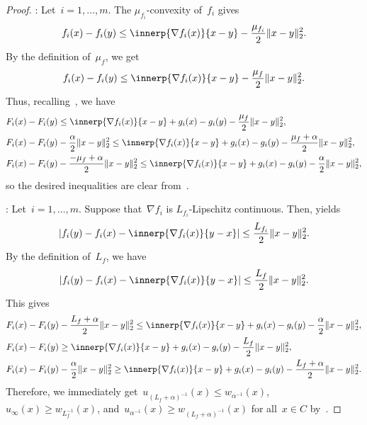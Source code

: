 \documentclass[../main]{subfiles}
\begin{document}
\begin{proof}
    :
    Let~$i = 1, \dots, m$.
    The $\mu_{f_i}$-convexity of~$f_i$ gives
    \begin{equation}
        f_i(x) - f_i(y) \le \innerp{\nabla f_i(x)}{x - y} - \frac{\mu_{f_i}}{2} \norm{x - y}_2^2
        .\end{equation}
    By the definition of~$\mu_f$, we get
    \begin{equation}
        f_i(x) - f_i(y) \le \innerp{\nabla f_i(x)}{x - y} - \frac{\mu_f}{2} \norm{x - y}_2^2
        .\end{equation}
    Thus, recalling~, we have
    \begin{align}
         & F_i(x) - F_i(y) \le \innerp{\nabla f_i(x)}{x - y} + g_i(x) - g_i(y) - \frac{\mu_f}{2} \norm{x - y}_2^2,                                              \\
         & F_i(x) - F_i(y) - \frac{\alpha}{2}\norm{x - y}_2^2 \le \innerp{\nabla f_i(x)}{x - y} + g_i(x) - g_i(y) - \frac{\mu_f + \alpha}{2} \norm{x - y}_2^2,  \\
         & F_i(x) - F_i(y) - \frac{- \mu_f + \alpha}{2}\norm{x - y}_2^2 \le \innerp{\nabla f_i(x)}{x - y} + g_i(x) - g_i(y) - \frac{\alpha}{2} \norm{x - y}_2^2
        ,\end{align}
    so the desired inequalities are clear from~.

    :
    Let~$i = 1, \dots, m$.
    Suppose that~$\nabla f_i$ is $L_{f_i}$-Lipschitz continuous.
    Then,  yields
    \begin{equation}
        \abs*{f_i(y) - f_i(x) - \innerp{\nabla f_i(x)}{y - x}} \le \frac{L_{f_i}}{2}\norm{x - y}_2^2.
    \end{equation}
    By the definition of~$L_f$, we have
    \begin{equation}
        \abs*{f_i(y) - f_i(x) - \innerp{\nabla f_i(x)}{y - x}} \le \frac{L_f}{2}\norm{x - y}_2^2.
    \end{equation}
    This gives
    \begin{align}
         & F_i(x) - F_i(y) - \frac{L_f + \alpha}{2} \norm{x - y}_2^2 \le \innerp{\nabla f_i(x)}{x - y} + g_i(x) - g_i(y) - \frac{\alpha}{2} \norm{x - y}_2^2, \\
         & F_i(x) - F_i(y) \ge \innerp{\nabla f_i(x)}{x - y} + g_i(x) - g_i(y) - \frac{L_f}{2} \norm{x - y}_2^2,                                              \\
         & F_i(x) - F_i(y) - \frac{\alpha}{2} \norm{x - y}_2^2 \ge \innerp{\nabla f_i(x)}{x - y} + g_i(x) - g_i(y) - \frac{L_f + \alpha}{2} \norm{x - y}_2^2
        .\end{align}
    Therefore, we immediately get~$u_{(L_f + \alpha)^{-1}}(x) \le w_{\alpha^{-1}}(x)$,~$u_\infty(x) \ge w_{L_f^{-1}}(x)$, and~$u_{\alpha^{-1}}(x) \ge w_{(L_f + \alpha)^{-1}}(x)$ for all~$x \in C$ by~.
\end{proof}
\end{document}
